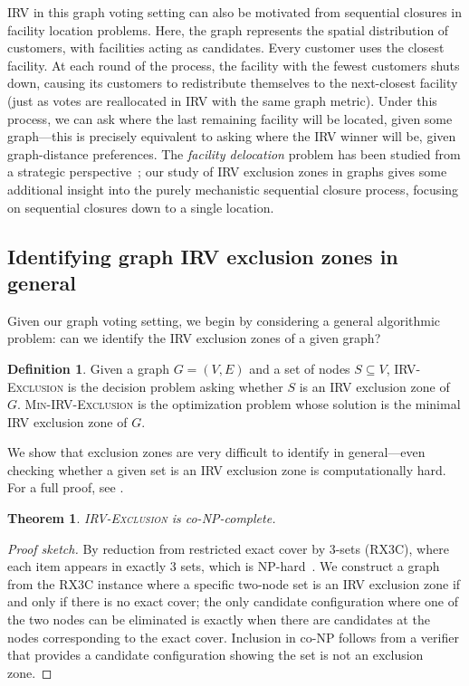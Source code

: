 \documentclass{article}
\theoremstyle{theorem}
\newtheorem{theorem}{Theorem}
\theoremstyle{definition}
\newtheorem{definition}{Definition}
\begin{document}
IRV in this graph voting setting can also be motivated from sequential closures in facility location problems. Here, the graph represents the spatial distribution of customers, with facilities acting as candidates. Every customer uses the closest facility. At each round of the process, the facility with the fewest customers shuts down, causing its customers to redistribute themselves to the next-closest facility (just as votes are reallocated in IRV with the same graph metric). Under this process, we can ask where the last remaining facility will be located, given some graph---this is precisely equivalent to asking where the IRV winner will be, given graph-distance preferences. The \emph{facility delocation} problem has been studied from a strategic perspective~\cite{bhaumik2010optimal,ruiz2017cournot}; our study of IRV exclusion zones in graphs gives some additional insight into the purely mechanistic sequential closure process, focusing on sequential closures down to a single location. 

\subsection{Identifying graph IRV exclusion zones in general}\label{sec:graph-general}
Given our graph voting setting, we begin by considering a general algorithmic problem: can we identify the IRV exclusion zones of a given graph?

\begin{definition}
  Given a graph $G = (V, E)$ and a set of nodes $S \subseteq V$, \textsc{IRV-Exclusion} is the decision problem asking whether $S$ is an IRV exclusion zone of $G$. \textsc{Min-IRV-Exclusion} is the optimization problem whose solution is the minimal IRV exclusion zone of $G$. 
\end{definition}

We show that exclusion zones are very difficult to identify in general---even checking whether a given set is an IRV exclusion zone is computationally hard. For a full proof, see . 

\begin{theorem}\label{thm:exclusion-co-np}
\textsc{IRV-Exclusion} is co-NP-complete. 
\end{theorem}

\begin{proof}[Proof sketch]
By reduction from restricted exact cover by 3-sets (RX3C), where each item appears in exactly 3 sets, which is NP-hard~\cite{gonzalez1985clustering}. We construct a graph from the RX3C instance where a specific two-node set is an IRV exclusion zone if and only if there is no exact cover; the only candidate configuration where one of the two nodes can be eliminated is exactly when there are candidates at the nodes corresponding to the exact cover. Inclusion in co-NP follows from a verifier that provides a candidate configuration showing the set is not an exclusion zone.
\end{proof}
\end{document}
